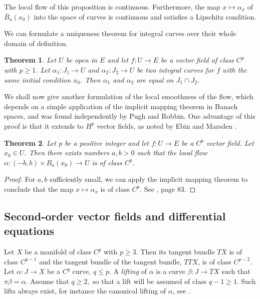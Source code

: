 \documentclass[a5paper,10pt,twoside]{article}
\theoremstyle{plain}
\newtheorem{teo}{Theorem}[section]
\theoremstyle{definition}
\theoremstyle{remark}
\begin{document}
The local flow of this proposition is continuous. Furthermore, the map $x\mapsto \alpha_x$ of $\bar{B}_a(x_0)$ into the space of curves is continuous and satisfies a Lipschitz condition.

We can formulate a uniqueness theorem for integral curves over their whole domain of definition.

\begin{teo}
Let $U$ be open in $E$ and let $f:U\to E$ be a vector field of class $C^p$ with $p\geq 1$. Let $\alpha_1:J_1\to U$ and $\alpha_2:J_2\to U$ be two integral curves for $f$ with the same initial condition $x_0$. Then $\alpha_1$ and $\alpha_2$ are equal on $J_1\cap J_2.$
\end{teo}

We shall now give another formulation of the local smoothness of the flow, which depends on a simple application of the implicit mapping theorem in Banach spaces, and was found independently by Pugh and Robbin. One advantage of this proof is that it extends to $H^p$ vector fields, as noted by Ebin and Marsden \cite{ebin1970groups}.

\begin{teo}
Let $p$ be a positive integer and let $f:U\to E$ be a $C^p$ vector field. Let $x_0\in U$. Then there exists numbers $a,b>0$ such that the local flow $\alpha:(-b,b)\times B_a(x_0)\to U$ is of class $C^p.$
\end{teo}

\begin{proof}
	For $a,b$ sufficiently small, we can apply the implicit mapping theorem to conclude that the map $x\mapsto \alpha_x$ is of class $C^p$. See \cite{lang1999}, page 83.
\end{proof}

\subsection{Second-order vector fields and differential equations}
Let $X$ be a manifold of class $C^p$ with $p\geq 3.$ Then its tangent bundle $TX$ is of class $C^{p-1}$ and the tangent bundle of the tangent bundle, $TTX$, is of class $C^{p-2}$. Let $\alpha:J\to X$ be a $C^q$ curve, $q\leq p.$ A \textit{lifting} of $\alpha$ is a curve $\beta:J\to TX$ such that $\pi\beta=\alpha$. Assume that $q\geq2,$ so that a lift will be assumed of class $q-1\geq 1.$ Such lifts always exist, for instance the canonical lifting of $\alpha$, see \cite{lang1999}.
\end{document}
